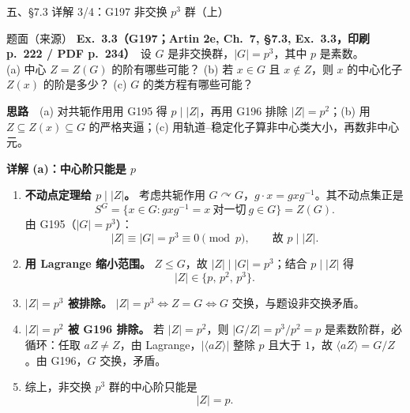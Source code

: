 \documentclass[aspectratio=169,10pt,fontset=none]{ctexbeamer}
\newcommand{\ex}[1]{\textcolor{accent}{\footnotesize\bfseries #1}}
\newcommand{\key}[1]{\textcolor{ink}{\bfseries #1}}
\begin{document}
\begin{frame}[t]{五、\S7.3 详解 3/4：G197 非交换 $p^3$ 群（上）}
\label{ex:G197}
\begin{block}{\footnotesize 题面（来源）}
\scriptsize
\textbf{Ex.~3.3（\ex{G197}；Artin 2e, Ch.~7, \S7.3, Ex.~3.3，印刷 p.~222 / PDF p.~234）}\ 
设 $G$ 是非交换群，$|G|=p^3$，其中 $p$ 是素数。\\
(a) 中心 $Z=Z(G)$ 的阶有哪些可能？\quad
(b) 若 $x\in G$ 且 $x\notin Z$，则 $x$ 的中心化子 $Z(x)$ 的阶是多少？\quad
(c) $G$ 的类方程有哪些可能？
\end{block}
{\footnotesize\key{思路}\ \ (a) 对共轭作用用 G195 得 $p\mid |Z|$，再用 G196 排除 $|Z|=p^2$；(b) 用 $Z\subseteq Z(x)\subseteq G$ 的严格夹逼；(c) 用轨道--稳定化子算非中心类大小，再数非中心元。\par}
{\footnotesize\key{详解 (a)：中心阶只能是 $p$}\par}
\begin{enumerate}\setlength{\itemsep}{1pt}
\scriptsize
\item \textbf{不动点定理给 $p\mid |Z|$。} 考虑共轭作用 $G\curvearrowright G$，$g\cdot x=gxg^{-1}$。其不动点集正是
\[ S^G=\{x\in G:gxg^{-1}=x\ \text{对一切}\ g\in G\}=Z(G). \]
由 G195（$|G|=p^3$）：
\[ |Z|\equiv |G|=p^3\equiv0\pmod p,\qquad\text{故 }p\mid |Z|. \]
\item \textbf{用 Lagrange 缩小范围。} $Z\le G$，故 $|Z|\mid|G|=p^3$；结合 $p\mid|Z|$ 得
\[ |Z|\in\{p,\,p^2,\,p^3\}. \]
\item \textbf{$|Z|=p^3$ 被排除。} $|Z|=p^3\iff Z=G\iff G$ 交换，与题设非交换矛盾。
\item \textbf{$|Z|=p^2$ 被 G196 排除。} 若 $|Z|=p^2$，则 $|G/Z|=p^3/p^2=p$ 是素数阶群，必循环：任取 $aZ\neq Z$，由 Lagrange，$|\langle aZ\rangle|$ 整除 $p$ 且大于 $1$，故 $\langle aZ\rangle=G/Z$。由 G196，$G$ 交换，矛盾。
\item 综上，非交换 $p^3$ 群的中心阶只能是
\[ |Z|=p. \]
\end{enumerate}
\end{frame}
\end{document}
